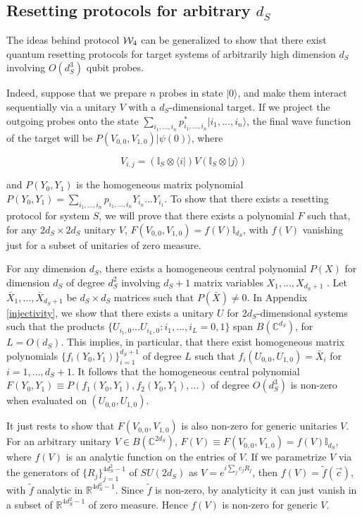 \documentclass[twocolumn,prx,aps,longbibliography]{revtex4-1}
\def\be{\begin{equation}}
\def\ee{\end{equation}}
\def\C{{\mathbb C}}
\def\id{{\mathbb I}}
\def\R{\mathbb{R}}
\def\bra#1{\langle#1|} \def\ket#1{|#1\rangle}
\def\id{{\mathbb I}}
\begin{document}
\begin{appendix}

\section{Resetting protocols for arbitrary $d_S$}
\label{existence}

The ideas behind protocol ${\cal W}_4$ can be generalized to show that there exist quantum resetting protocols for target systems of arbitrarily high dimension $d_S$ involving $O(d_S^3)$ qubit probes.


Indeed, suppose that we prepare $n$ probes in state $\ket{0}$, and make them interact sequentially via a unitary $V$ with a $d_S$-dimensional target. If we project the outgoing probes onto the state $\sum_{i_1,...,i_n}p^*_{i_1,...,i_n}\ket{i_1,...,i_n}$, the final wave function of the target will be $P(V_{0,0},V_{1,0})\ket{\psi(0)}$, where 

\be
V_{i,j}=(\id_S\otimes \bra{i})V(\id_S\otimes \ket{j})
\label{partV}
\ee

\noindent and $P(Y_0,Y_1)$ is the homogeneous matrix polynomial $P(Y_0,Y_1)=\sum_{i_1,...,i_n}p_{i_1,...,i_n}Y_{i_n}...Y_{i_1}$. To show that there exists a resetting protocol for system $S$, we will prove that there exists a polynomial $F$ such that, for any $2d_S\times 2d_S$ unitary $V$, $F(V_{0,0},V_{1,0})=f(V)\id_{d_S}$, with $f(V)$ vanishing just for a subset of unitaries of zero measure.


For any dimension $d_S$, there exists a homogeneous central polynomial $P(X)$ for dimension $d_S$ of degree $d_S^2$ involving $d_S+1$ matrix variables $X_1,...,X_{d_S+1}$ \cite{polyId}. Let $\bar{X}_1,...,\bar{X}_{d_S+1}$ be $d_S\times d_S$ matrices such that $P(\bar{X})\not=0$. In Appendix \ref{injectivity}, we show that there exists a unitary $U$ for $2d_S$-dimensional systems such that the products $\{U_{i_1,0}...U_{i_L,0}:i_1,...,i_L=0,1\}$ span $B(\C^{d_S})$, for $L=O(d_S)$. This implies, in particular, that there exist homogeneous matrix polynomials $\{f_i(Y_0,Y_1)\}_{i=1}^{d_S+1}$ of degree $L$ such that $f_i(U_{0,0},U_{1,0})=\bar{X}_i$ for $i=1,...,d_S+1$. It follows that the homogeneous central polynomial $F(Y_0,Y_1)\equiv P(f_1(Y_0,Y_1), f_2(Y_0,Y_1),...)$ of degree $O(d_S^3)$ is non-zero when evaluated on $(U_{0,0},U_{1,0})$. 

It just rests to show that $F(V_{0,0},V_{1,0})$ is also non-zero for generic unitaries $V$. For an arbitrary unitary $V\in B(\C^{2d_S})$, $F(V)\equiv F(V_{0,0},V_{1,0})=f(V)\id_{d_S}$, where $f(V)$ is an analytic function on the entries of $V$. If we parametrize $V$ via the generators of $\{R_j\}_{j=1}^{4d_S^2-1}$ of $SU(2d_S)$ as $V=e^{i\sum_{j}c_jR_j}$, then $f(V)=\tilde{f}(\vec{c})$, with $\tilde{f}$ analytic in $\R^{4d_S^2-1}$. Since $\tilde{f}$ is non-zero, by analyticity it can just vanish in a subset of $\R^{4d_S^2-1}$ of zero measure. Hence $f(V)$ is non-zero for generic $V$.




\end{appendix}
\end{document}
